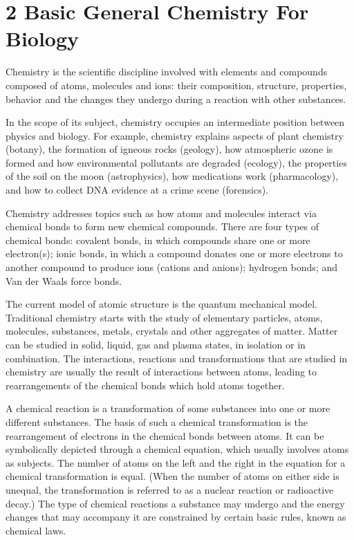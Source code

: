 \documentclass[
]{article}
\theoremstyle{definition}
\theoremstyle{definition}
\theoremstyle{definition}
\theoremstyle{remark}
\begin{document}
\hypertarget{section-}{}
\hypertarget{basic-general-chemistry-for-biology}{%
\section{\texorpdfstring{{2} Basic General Chemistry For
Biology}{2 Basic General Chemistry For Biology}}\label{basic-general-chemistry-for-biology}}

Chemistry is the scientific discipline involved with elements and
compounds composed of atoms, molecules and ions: their composition,
structure, properties, behavior and the changes they undergo during a
reaction with other substances.

In the scope of its subject, chemistry occupies an intermediate position
between physics and biology. For example, chemistry explains aspects of
plant chemistry (botany), the formation of igneous rocks (geology), how
atmospheric ozone is formed and how environmental pollutants are
degraded (ecology), the properties of the soil on the moon
(astrophysics), how medications work (pharmacology), and how to collect
DNA evidence at a crime scene (forensics).

Chemistry addresses topics such as how atoms and molecules interact via
chemical bonds to form new chemical compounds. There are four types of
chemical bonds: covalent bonds, in which compounds share one or more
electron(s); ionic bonds, in which a compound donates one or more
electrons to another compound to produce ions (cations and anions);
hydrogen bonds; and Van der Waals force bonds.

The current model of atomic structure is the quantum mechanical model.
Traditional chemistry starts with the study of elementary particles,
atoms, molecules, substances, metals, crystals and other aggregates of
matter. Matter can be studied in solid, liquid, gas and plasma states,
in isolation or in combination. The interactions, reactions and
transformations that are studied in chemistry are usually the result of
interactions between atoms, leading to rearrangements of the chemical
bonds which hold atoms together.

A chemical reaction is a transformation of some substances into one or
more different substances. The basis of such a chemical transformation
is the rearrangement of electrons in the chemical bonds between atoms.
It can be symbolically depicted through a chemical equation, which
usually involves atoms as subjects. The number of atoms on the left and
the right in the equation for a chemical transformation is equal. (When
the number of atoms on either side is unequal, the transformation is
referred to as a nuclear reaction or radioactive decay.) The type of
chemical reactions a substance may undergo and the energy changes that
may accompany it are constrained by certain basic rules, known as
chemical laws.
\end{document}
